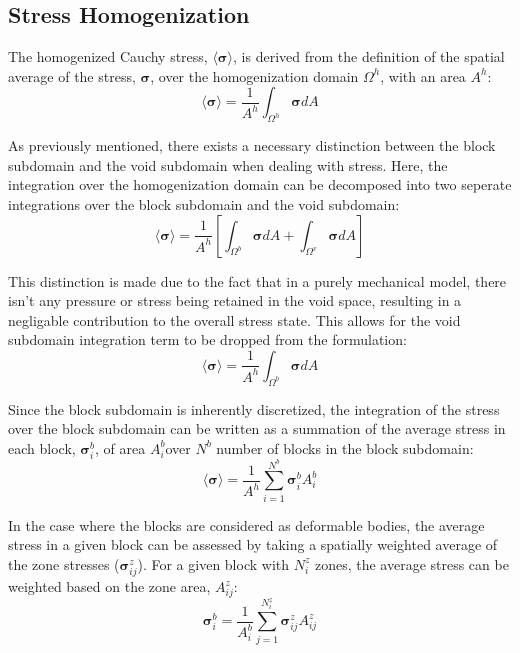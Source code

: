 \subsection{Stress Homogenization}

The homogenized Cauchy stress, $\langle\boldsymbol{\sigma}\rangle$,
is derived from the definition of the spatial average of the stress,
$\boldsymbol{\sigma}$, over the homogenization domain $\Omega^{h}$,
with an area $A^{h}$: 
\begin{equation}
\langle\boldsymbol{\sigma}\rangle=\frac{1}{A^{h}}\int_{\Omega^{h}}\boldsymbol{\sigma}dA\label{eqn:stress1}
\end{equation}


As previously mentioned, there exists a necessary distinction between
the block subdomain and the void subdomain when dealing with stress.
Here, the integration over the homogenization domain can be decomposed
into two seperate integrations over the block subdomain and the void
subdomain: 
\begin{equation}
\langle\boldsymbol{\sigma}\rangle=\frac{1}{A^{h}}\left[\int_{\Omega^{b}}\boldsymbol{\sigma}dA+\int_{\Omega^{v}}\boldsymbol{\sigma}dA\right]\label{eqn:stress2}
\end{equation}


This distinction is made due to the fact that in a purely mechanical
model, there isn't any pressure or stress being retained in the void
space, resulting in a negligable contribution to the overall stress
state. This allows for the void subdomain integration term to be dropped
from the formulation: 
\begin{equation}
\langle\boldsymbol{\sigma}\rangle=\frac{1}{A^{h}}\int_{\Omega^{b}}\boldsymbol{\sigma}dA\label{eqn:stress2a}
\end{equation}


Since the block subdomain is inherently discretized, the integration
of the stress over the block subdomain can be written as a summation
of the average stress in each block, $\boldsymbol{\sigma}_{i}^{b}$,
of area $A_{i}^{b}$over $N^{b}$ number of blocks in the block subdomain:
\begin{equation}
\langle\boldsymbol{\sigma}\rangle=\frac{1}{A^{h}}\sum_{i=1}^{N^{b}}\boldsymbol{\sigma}_{i}^{b}A_{i}^{b}\label{eqn:stress3}
\end{equation}


In the case where the blocks are considered as deformable bodies,
the average stress in a given block can be assessed by taking a spatially
weighted average of the zone stresses ($\boldsymbol{\sigma}_{ij}^{z}$).
For a given block with $N_{i}^{z}$ zones, the average stress can
be weighted based on the zone area, $A_{ij}^{z}$: 
\begin{equation}
\boldsymbol{\sigma}_{i}^{b}=\frac{1}{A_{i}^{b}}\sum_{j=1}^{N_{i}^{z}}\boldsymbol{\sigma}_{ij}^{z}A_{ij}^{z}\label{eqn:stress3a}
\end{equation}


